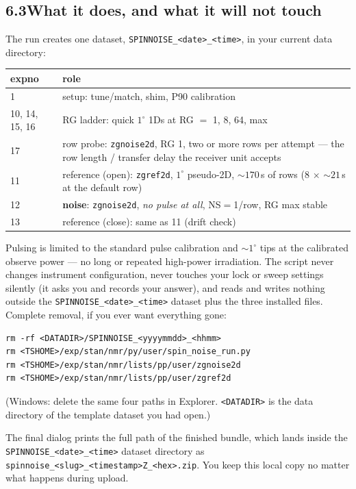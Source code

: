 \documentclass[11pt]{article}
\newcommand{\file}[1]{\texttt{#1}}
\begin{document}
\subsection*{6.3\quad What it does, and what it will not touch}

The run creates one dataset, \file{SPINNOISE\_<date>\_<time>}, in your current data
directory:

\begin{center}
\begin{tabular}{@{}ll@{}}
\toprule
expno & role \\
\midrule
1 & setup: tune/match, shim, P90 calibration \\
10, 14, 15, 16 & RG ladder: quick $1^{\circ}$ 1Ds at RG $=$ 1, 8, 64, max \\
17 & row probe: \file{zgnoise2d}, RG 1, two or more rows per attempt ---
     the row length / transfer delay the receiver unit accepts \\
11 & reference (open): \file{zgref2d}, $1^{\circ}$ pseudo-2D, ${\sim}170$\,s
     of rows (8 $\times$ ${\sim}21$\,s at the default row) \\
12 & \textbf{noise}: \file{zgnoise2d}, \emph{no pulse at all}, NS$=$1/row,
     RG max stable \\
13 & reference (close): same as 11 (drift check) \\
\bottomrule
\end{tabular}
\end{center}

Pulsing is limited to the standard pulse calibration and ${\sim}1^{\circ}$
tips at the calibrated observe power --- no long or repeated high-power
irradiation. The script never changes instrument configuration, never touches
your lock or sweep settings silently (it asks you and records your answer),
and reads and writes nothing outside the \file{SPINNOISE\_<date>\_<time>} dataset
plus the three installed files. Complete removal, if you ever want everything
gone:
\begin{lstlisting}
rm -rf <DATADIR>/SPINNOISE_<yyyymmdd>_<hhmm>
rm <TSHOME>/exp/stan/nmr/py/user/spin_noise_run.py
rm <TSHOME>/exp/stan/nmr/lists/pp/user/zgnoise2d
rm <TSHOME>/exp/stan/nmr/lists/pp/user/zgref2d
\end{lstlisting}
(Windows: delete the same four paths in Explorer. \file{<DATADIR>} is the
data directory of the template dataset you had open.)

The final dialog prints the full path of the finished bundle, which lands
inside the \file{SPINNOISE\_<date>\_<time>} dataset directory as
\file{spinnoise\_<slug>\_<timestamp>Z\_<hex>.zip}. You keep this local copy
no matter what happens during upload.
\end{document}
